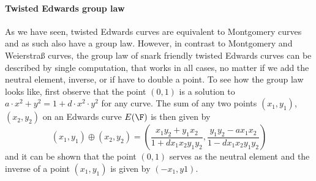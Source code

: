 \paragraph{Twisted Edwards group law}As we have seen, twisted Edwards curves are equivalent to Montgomery curves and as such also have a group law. However, in contrast to Montgomery and Weierstraß curves, the group law of snark friendly twisted Edwards curves can be described by single computation, that works in all cases, no matter if we add the neutral element, inverse, or if have to double a point. To see how the group law looks like, first observe that the point $(0,1)$ is
a solution to $a\cdot x^{2} + y^2 =1+ d\cdot x^{2}\cdot y^2$ for any curve. The sum of any two points $(x_1, y_1)$, $(x_2, y_2)$ on an Edwards curve $E(\F)$ is then given by
$$
(x_1, y_1) \oplus (x_2, y_2) =\left(\frac{x_1y_2+y_1x_2}{1 +dx_1x_2y_1y_2},\frac{y_1y_2-ax_1x_2}{1-dx_1x_2y_1y_2}\right)
$$
and it can be shown that the point $(0,1)$ serves as the neutral element and the inverse of a point $(x_1, y_1)$ is given by $(-x_1, y1)$.
